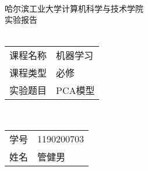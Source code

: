 \begin{center}
    \quad \vspace{3cm} \\
    \Large
    哈尔滨工业大学计算机科学与技术学院 \\
    
    \Huge
    实验报告 \\
    \quad \vspace{1cm} \\
    
    \Large
    \begin{tabular}{r@{：}l}
        课程名称 & 机器学习 \\
        课程类型 & 必修 \\
        实验题目 & PCA模型 \\
    \end{tabular}
    \quad \vspace{1cm} \\
    
    \large
    \begin{tabular}{r@{：}l}
    学号 & 1190200703 \\
    姓名 & 管健男 \\
    \end{tabular}

\end{center}
